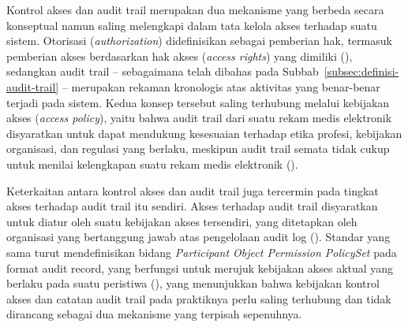 Kontrol akses dan audit trail merupakan dua mekanisme yang berbeda secara konseptual namun saling melengkapi dalam tata kelola akses terhadap suatu sistem. Otorisasi (\textit{authorization}) didefinisikan sebagai pemberian hak, termasuk pemberian akses berdasarkan hak akses (\textit{access rights}) yang dimiliki (\cite{iso27789_2021}), sedangkan audit trail -- sebagaimana telah dibahas pada Subbab~\ref{subsec:definisi-audit-trail} -- merupakan rekaman kronologis atas aktivitas yang benar-benar terjadi pada sistem. Kedua konsep tersebut saling terhubung melalui kebijakan akses (\textit{access policy}), yaitu bahwa audit trail dari suatu rekam medis elektronik disyaratkan untuk dapat mendukung kesesuaian terhadap etika profesi, kebijakan organisasi, dan regulasi yang berlaku, meskipun audit trail semata tidak cukup untuk menilai kelengkapan suatu rekam medis elektronik (\cite{iso27789_2021}).

Keterkaitan antara kontrol akses dan audit trail juga tercermin pada tingkat akses terhadap audit trail itu sendiri. Akses terhadap audit trail disyaratkan untuk diatur oleh suatu kebijakan akses tersendiri, yang ditetapkan oleh organisasi yang bertanggung jawab atas pengelolaan audit log (\cite{iso27789_2021}). Standar yang sama turut mendefinisikan bidang \textit{Participant Object Permission PolicySet} pada format audit record, yang berfungsi untuk merujuk kebijakan akses aktual yang berlaku pada suatu peristiwa (\cite{iso27789_2021}), yang menunjukkan bahwa kebijakan kontrol akses dan catatan audit trail pada praktiknya perlu saling terhubung dan tidak dirancang sebagai dua mekanisme yang terpisah sepenuhnya.

